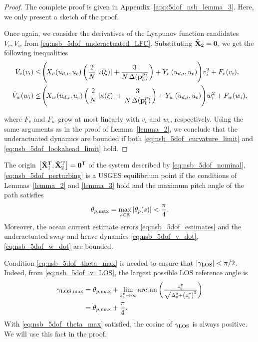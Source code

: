 \begin{proof}
    The complete proof is given in Appendix~\ref{app:5dof_nsb_lemma_3}.
    Here, we only present a sketch of the proof.

    Once again, we consider the derivatives of the Lyapunov function candidates {$V_v, V_w$} from \eqref{eq:nsb_5dof_underactuated_LFC}.
    Substituting $\tilde{\mathbf{X}}_2 = \mathbf{0}$, we get the following inequalities
    \begin{align} 
            \dot{V}_v(v_i) &\leq \!\Bigg(\!X_{v\!}\left(u_{d,i}, u_c\right)\left(\frac{2}{N}\abs{\iota(\xi)} + \frac{3}{N\,\Delta(\mat{p}_b^p)}\right) + Y_v\left(u_{d,i}, u_c\right)\!\Bigg)v_i^2 + F_v(v_i), \\
            \dot{V}_w(w_i) &\leq \!\Bigg(\!X_{w\!}\left(u_{d,i}, u_c\right)\left(\frac{2}{N}\abs{\kappa(\xi)} + \frac{3}{N\,\Delta(\mat{p}_b^p)}\right) + Y_w\left(u_{d,i}, u_c\right)\!\Bigg)w_i^2 + F_w(w_i),
    \end{align}\vspace{-3mm}

    \noindent where $F_v$ and $F_w$ grow at most linearly with $v_i$ and $w_i$, respectively.
    Using the same arguments as in the proof of Lemma~\ref{lemma_2}, we conclude that the underactuated dynamics are bounded if both \eqref{eq:nsb_5dof_curvature_limit} and \eqref{eq:nsb_5dof_lookahead_limit} hold.
\end{proof}

\begin{theorem}
    The origin $\left[\tilde{\mathbf{X}}_1^{\mathrm{T}}, \tilde{\mathbf{X}}_2^{\mathrm{T}}\right] = \mathbf{0}^{\mathrm{T}}$ of the system described by \eqref{eq:nsb_5dof_nominal}, \eqref{eq:nsb_5dof_perturbing} is a USGES equilibrium point if the conditions of Lemmas~\ref{lemma_2} and \ref{lemma_3} hold and the maximum pitch angle of the path satisfies
    \begin{equation}
        \theta_{p, {\rm max}} = \max_{s \in \mathbb{R}} \left|\theta_p(s)\right| < \frac{\pi}{4}.
        \label{eq:nsb_5dof_theta_max}
    \end{equation}
    Moreover, the ocean current estimate errors \eqref{eq:nsb_5dof_estimates} and the underactuated sway and heave dynamics \eqref{eq:nsb_5dof_v_dot}, \eqref{eq:nsb_5dof_w_dot} are bounded.
\end{theorem}

\begin{rmk*}
Condition \eqref{eq:nsb_5dof_theta_max} is needed to ensure that $\left|\gamma_{\rm LOS}\right| < \pi/2$.
Indeed, from \eqref{eq:nsb_5dof_v_LOS}, the largest possible LOS reference angle is
\begin{equation}
    \begin{split}
        \gamma_{\rm LOS, max} &= \theta_{p, {\rm max}} + \lim_{z_b^p \rightarrow \infty} \arctan\left(\scale[1]{\frac{z_b^p}{\sqrt{\Delta_0^2 + \left(z_b^p\right)^2}}}\right) \\
        &= \theta_{p, {\rm max}} + \frac{\pi}{4}.
    \end{split}
\end{equation}
With \eqref{eq:nsb_5dof_theta_max} satisfied, the cosine of $\gamma_{\rm LOS}$ is always positive. We will use this fact in the proof.
\end{rmk*}


